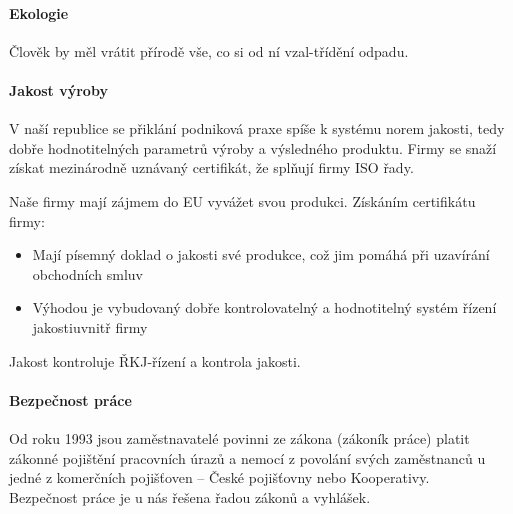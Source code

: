 \paragraph*{Ekologie}
Člověk by měl vrátit přírodě vše, co si od ní vzal-třídění odpadu.

\paragraph*{Jakost výroby}
V naší republice se přiklání podniková praxe spíše k systému norem jakosti, tedy dobře hodnotitelných parametrů výroby a výsledného produktu. Firmy se snaží získat mezinárodně uznávaný certifikát, že splňují firmy ISO řady. \par Naše firmy mají zájmem do EU vyvážet svou produkci. Získáním certifikátu firmy:
\begin{itemize}
    \item Mají písemný doklad o jakosti své produkce, což jim pomáhá při uzavírání obchodních smluv
    \item Výhodou je vybudovaný dobře kontrolovatelný a hodnotitelný systém řízení jakostiuvnitř firmy
\end{itemize}

Jakost kontroluje ŘKJ-řízení a kontrola jakosti.

\paragraph*{Bezpečnost práce}
Od roku 1993 jsou zaměstnavatelé povinni ze zákona (zákoník práce) platit zákonné pojištění pracovních úrazů a nemocí z povolání svých zaměstnanců u jedné z komerčních pojišťoven -- České pojišťovny nebo Kooperativy. \\ Bezpečnost práce je u nás řešena řadou zákonů a vyhlášek.

